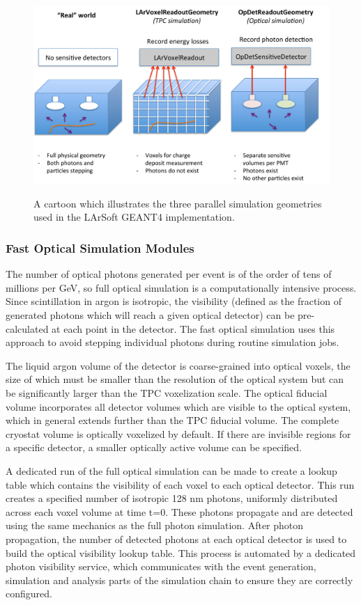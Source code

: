 \documentclass[12pt]{elsarticle}
\begin{document}
\begin{figure}[h]
\centering
\caption{A cartoon which illustrates the three parallel simulation geometries used in the LArSoft
GEANT4 implementation.}
\includegraphics[width=6.0in]{./mtrls/imgs/ParallelGeomScheme.pdf}
\label{fig:parallelgeom}
\end{figure}

\subsubsection{Fast Optical Simulation Modules}

The number of optical photons generated per event is of the order of tens of millions per GeV, so full optical simulation is a computationally intensive process.  Since scintillation in argon is isotropic, the visibility (defined as the fraction of generated photons which will reach a given optical detector) can be pre-calculated at each point in the detector.  The fast optical simulation uses this approach to avoid stepping individual photons during routine simulation jobs.

The liquid argon volume of the detector is coarse-grained into optical voxels, the size of which must be smaller than the resolution of the optical system but can be significantly larger than the TPC voxelization scale.  The optical fiducial volume incorporates all detector volumes which are visible to the optical system, which in general extends further than the TPC fiducial volume.  The complete cryostat volume is optically voxelized by default. If there are invisible regions for a specific detector, a smaller optically active volume can be specified.

A dedicated run of the full optical simulation can be made to create a lookup table which contains the visibility of each voxel to each optical detector.  This run creates a specified number of isotropic 128 nm photons, uniformly distributed across each voxel volume at time t=0.  These photons propagate and are detected using the same mechanics as the full photon simulation.  After photon propagation, the number of detected photons at each optical detector is used to build the optical visibility lookup table.  This process is automated by a dedicated photon visibility service, which communicates with the event generation, simulation and analysis parts of the simulation chain to ensure they are correctly configured.
\end{document}
